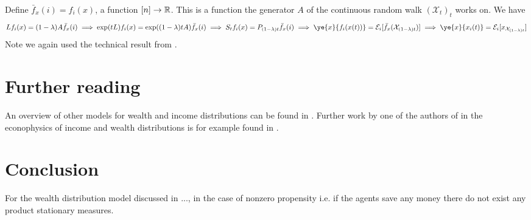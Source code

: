 \documentclass{article}
\begin{document}
Define $\bar{f}_x(i) = f_i(x)$, a function $[n] \to \mathbb{R}$. This is a function the generator $A$ of the continuous random walk $(\mathcal{X}_t)_t$ works on. We have
\[
Lf_i(x) = (1 - \lambda) A \bar{f}_x(i)
\\\implies
\exp(tL)f_i(x) = \exp((1 - \lambda)t A) \bar{f}_x (i)
\\\implies
S_t f_i(x) = P_{(1 - \lambda)t} \bar{f}_x(i)
\\\implies
\ye{x}{f_i(x(t))} = \mathcal{E}_i\brackets{\bar{f}_x(\mathcal{X}_{(1-\lambda)t})}
\\\implies
\ye{x}{x_i(t)} = \mathcal{E}_i\brackets{x_{\mathcal{X}_{(1-\lambda)t}}}
\]
Note we again used the technical result from \cite{voss2011equivalence}.


\section*{Further reading}
An overview of other models for wealth and income distributions can be found in \cite{chakrabarti2013econophysics}. Further work by one of the authors of \cite{cirillo2014duality} in the econophysics of income and wealth distributions is for example found in \cite{redig2015multilinearity, 2008arXiv0802.1416D, redig2017generalized}.



\section*{Conclusion}
For the wealth distribution model discussed in ..., in the case of nonzero propensity i.e. if the agents save any money there do not exist any product stationary measures.



\printbibliography
\end{document}
